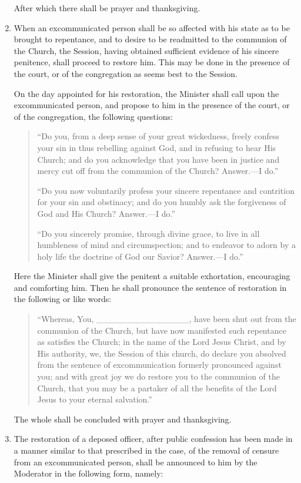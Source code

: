 \documentclass[
]{book}
\begin{document}
\begin{enumerate}
  After which there shall be prayer and thanksgiving.
\item
  When an excommunicated person shall be so affected with his state as to be brought to repentance, and to desire to be readmitted to the communion of the Church, the Session, having obtained sufficient evidence of his sincere penitence, shall proceed to restore him. This may be done in the presence of the court, or of the congregation as seems best to the Session.

  On the day appointed for his restoration, the Minister shall call upon the excommunicated person, and propose to him in the presence of the court, or of the congregation, the following questions:

  \begin{quote}
  ``Do you, from a deep sense of your great wickedness, freely confess your sin in thus rebelling against God, and in refusing to hear His Church; and do you acknowledge that you have been in justice and mercy cut off from the communion of the Church? Answer.---I do.''

  ``Do you now voluntarily profess your sincere repentance and contrition for your sin and obstinacy; and do you humbly ask the forgiveness of God and His Church? Answer.---I do.''

  ``Do you sincerely promise, through divine grace, to live in all humbleness of mind and circumspection; and to endeavor to adorn by a holy life the doctrine of God our Savior? Answer.---I do.''
  \end{quote}

  Here the Minister shall give the penitent a suitable exhortation, encouraging and comforting him. Then he shall pronounce the sentence of restoration in the following or like words:

  \begin{quote}
  ``Whereas, You, \_\_\_\_\_\_\_\_\_\_\_\_\_\_\_, have been shut out from the communion of the Church, but have now manifested such repentance as satisfies the Church; in the name of the Lord Jesus Christ, and by His authority, we, the Session of this church, do declare you absolved from the sentence of excommunication formerly pronounced against you; and with great joy we do restore you to the communion of the Church, that you may be a partaker of all the benefits of the Lord Jesus to your eternal salvation.''
  \end{quote}

  The whole shall be concluded with prayer and thanksgiving.
\item
  The restoration of a deposed officer, after public confession has been made in a manner similar to that prescribed in the case, of the removal of censure from an excommunicated person, shall be announced to him by the Moderator in the following form, namely:


\end{enumerate}
\end{document}
